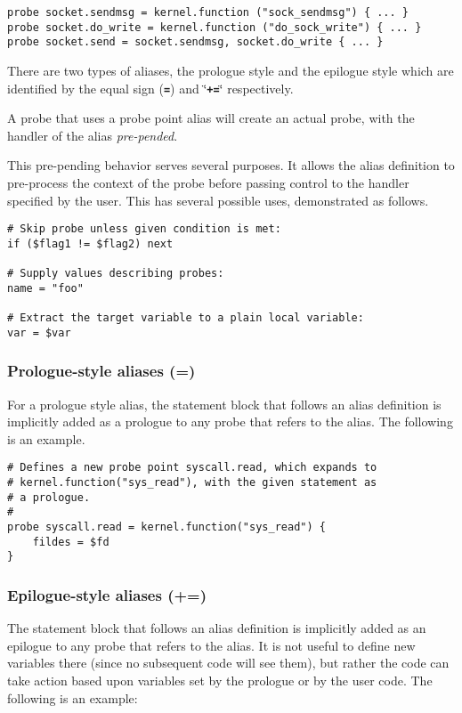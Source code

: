 \documentclass[twoside,english]{article}
\newenvironment{vindent}
{\begin{list}{}{\setlength{\listparindent}{6pt}}
\item[]}
{\end{list}}
\begin{document}
\begin{vindent}
\begin{verbatim}
probe socket.sendmsg = kernel.function ("sock_sendmsg") { ... }
probe socket.do_write = kernel.function ("do_sock_write") { ... }
probe socket.send = socket.sendmsg, socket.do_write { ... }
\end{verbatim}
\end{vindent}

There are two types of aliases, the prologue style and the epilogue style
which are identified by the equal sign (\texttt{\textbf{=}}) and \char`\"{}\texttt{\textbf{+=}}\char`\"{}
respectively.

A probe that uses a probe point alias will create an actual probe, with
the handler of the alias \emph{pre-pended}.

This pre-pending behavior serves several purposes. It allows the alias definition
to pre-process the context of the probe before passing control to the handler
specified by the user. This has several possible uses, demonstrated as follows.

\begin{vindent}
\begin{verbatim}
# Skip probe unless given condition is met:
if ($flag1 != $flag2) next

# Supply values describing probes:
name = "foo"

# Extract the target variable to a plain local variable:
var = $var
\end{verbatim}
\end{vindent}

\subsubsection{Prologue-style aliases (=)}
\index{=}
For a prologue style alias, the statement block that follows an alias definition
is implicitly added as a prologue to any probe that refers to the alias.
The following is an example.

\begin{vindent}
\begin{verbatim}
# Defines a new probe point syscall.read, which expands to
# kernel.function("sys_read"), with the given statement as
# a prologue.
#
probe syscall.read = kernel.function("sys_read") {
    fildes = $fd
}
\end{verbatim}
\end{vindent}

\subsubsection{Epilogue-style aliases (+=)}
\index{+=}
The statement block that follows an alias definition is implicitly added
as an epilogue to any probe that refers to the alias.  It is not useful
to define new variables there (since no subsequent code will see them), but
rather the code can take action based upon variables set by the
prologue or by the user code.  The following is an example:
\end{document}
